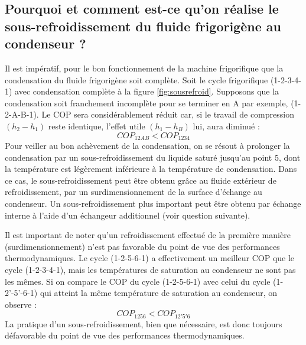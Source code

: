 \subsection{Pourquoi et comment est-ce qu'on réalise le sous-refroidissement du fluide frigorigène au condenseur ?\label{ssec:sous-refroidissement}}
Il est impératif, pour le bon fonctionnement de la machine frigorifique que la condensation du fluide frigorigène soit complète. Soit le cycle frigorifique (1-2-3-4-1) avec condensation complète à la figure \ref{fig:sousrefroid}. Supposons que la condensation soit franchement incomplète pour se terminer en A par exemple, (1-2-A-B-1). Le COP sera considérablement réduit car, si le travail de compression $(h_2-h_1)$ reste identique, l'effet utile $(h_1-h_B)$ lui, aura diminué :
\begin{equation} COP_{12AB} < COP_{1234} \end{equation}
Pour veiller au bon achèvement de la condensation, on se résout à prolonger la condensation par un sous-refroidissement du liquide saturé jusqu'au point 5, dont la température est légèrement inférieure à la température de condensation. Dans ce cas, le sous-refroidissement peut être obtenu grâce au fluide extérieur de refroidissement, par un surdimensionnement de la surface d'échange au condenseur. Un sous-refroidissement plus important peut être obtenu par échange interne à l'aide d'un échangeur additionnel (voir question suivante). 

Il est important de noter qu'un refroidissement effectué de la première manière (surdimensionnement) n'est pas favorable du point de vue des performances thermodynamiques. Le cycle (1-2-5-6-1) a effectivement un meilleur COP que le cycle (1-2-3-4-1), mais les températures de saturation au condenseur ne sont pas les mêmes. Si on compare le COP du cycle (1-2-5-6-1) avec celui du cycle (1-2'-5'-6-1) qui atteint la même température de saturation au condenseur, on observe :
\begin{equation} COP_{1256} < COP_{12'5'6} \end{equation}  
La pratique d'un sous-refroidissement, bien que nécessaire, est donc toujours défavorable du point de vue des performances thermodynamiques.

